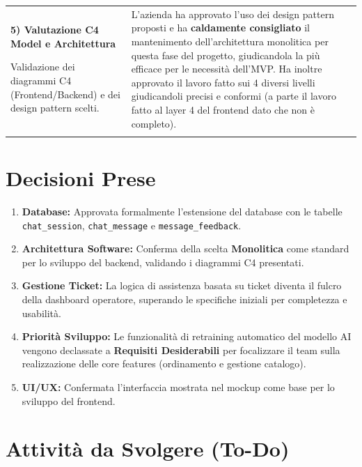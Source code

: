 \documentclass[a4paper, 11pt, oneside]{scrartcl} %
\begin{document}
\begin{tabularx}{\textwidth}{p{} X}
\textbf{5) Valutazione C4 Model e Architettura} \par
Validazione dei diagrammi C4 (Frontend/Backend) e dei design pattern scelti.
&
L'azienda ha approvato l'uso dei design pattern proposti e ha \textbf{caldamente consigliato} il mantenimento dell'architettura monolitica per questa fase del progetto, giudicandola la più efficace per le necessità dell'MVP. Ha inoltre approvato il lavoro fatto sui 4 diversi livelli giudicandoli precisi e conformi (a parte il lavoro fatto al layer 4 del frontend dato che non è completo).
\\ \addlinespace
\bottomrule
\end{tabularx}
\normalsize

\newpage
\section{Decisioni Prese}

\begin{enumerate}
\item \textbf{Database:} Approvata formalmente l'estensione del database con le tabelle \texttt{chat\_session}, \texttt{chat\_message} e \texttt{message\_feedback}.
\item \textbf{Architettura Software:} Conferma della scelta \textbf{Monolitica} come standard per lo sviluppo del backend, validando i diagrammi C4 presentati.
\item \textbf{Gestione Ticket:} La logica di assistenza basata su ticket diventa il fulcro della dashboard operatore, superando le specifiche iniziali per completezza e usabilità.
\item \textbf{Priorità Sviluppo:} Le funzionalità di retraining automatico del modello AI vengono declassate a \textbf{Requisiti Desiderabili} per focalizzare il team sulla realizzazione delle core features (ordinamento e gestione catalogo).
\item \textbf{UI/UX:} Confermata l'interfaccia mostrata nel mockup come base per lo sviluppo del frontend.
\end{enumerate}

\newpage
\section{Attività da Svolgere (To-Do)}
\end{document}
